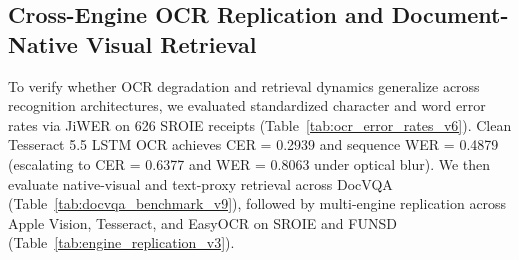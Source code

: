 \subsection{Cross-Engine OCR Replication and Document-Native Visual Retrieval}
\label{sec:cross_engine_replication}

To verify whether OCR degradation and retrieval dynamics generalize across recognition architectures, we evaluated standardized character and word error rates via JiWER \cite{vaessen2024jiwer} on 626 SROIE receipts (Table~\ref{tab:ocr_error_rates_v6}). Clean Tesseract 5.5 LSTM OCR \cite{smith2007tesseract} achieves CER = 0.2939 and sequence WER = 0.4879 (escalating to CER = 0.6377 and WER = 0.8063 under optical blur). We then evaluate native-visual and text-proxy retrieval across DocVQA (Table~\ref{tab:docvqa_benchmark_v9}), followed by multi-engine replication across Apple Vision, Tesseract, and EasyOCR on SROIE and FUNSD (Table~\ref{tab:engine_replication_v3}).

